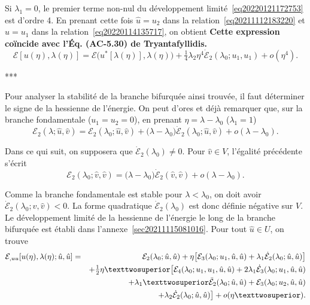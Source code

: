 \documentclass[12pt, final]{amsart}
\begin{document}
Si \(\lambda _1=0\), le premier terme non-nul du développement
limité~\eqref{eq20220121172753} est d'ordre 4. En prenant cette fois
\(\hat{u}=u_2\) dans la relation~\eqref{eq20211112183220} et \(\hat{u}=u_1\)
dans la relation~\eqref{eq20220114135717}, on obtient \textbf{Cette
  expression coïncide avec l'Éq. (AC-5.30) de Tryantafyllidis.}
\begin{equation}
  \mathcal E[u(\eta ), \lambda (\eta )]=\mathcal E\bigl(u^*[\lambda (\eta )], \lambda (\eta )\bigr)+\tfrac1{4}\lambda _2\eta ^4\dot{\mathcal E}_2(\lambda _0; u_1, u_1)+o(\eta ^4).
\end{equation}

\begin{center}
  ***
\end{center}

Pour analyser la stabilité de la branche bifurquée ainsi trouvée, il faut
déterminer le signe de la hessienne de l'énergie. On peut d'ores et déjà
remarquer que, sur la branche fondamentale (\(u_1=u_2=0\)), en prenant \(\eta =\lambda -\lambda _0\)
(\(\lambda _1=1\))
\begin{equation}
  \mathcal E_2(\lambda ; \hat{u}, \hat{v})
  =\mathcal E_2(\lambda _0; \hat{u}, \hat{v})+\bigl(\lambda -\lambda _0\bigr)\dot{\mathcal E}_2(\lambda _0; \hat{u}, \hat{v})+o(\lambda -\lambda _0).
\end{equation}

Dans ce qui suit, on supposera que \(\dot{\mathcal E}_2(\lambda _0)\neq0\). Pour \(\hat{v}\in V\),
l'égalité précédente s'écrit
\begin{equation}
  \mathcal E_2(\lambda _0; \hat{v}, \hat{v})=\bigl(\lambda -\lambda _0\bigr)\dot{\mathcal E}_2(\hat{v}, \hat{v})+o(\lambda -\lambda _0).
\end{equation}

Comme la branche fondamentale est stable pour \(\lambda <\lambda _0\), on doit avoir
\(\dot{\mathcal E}_2(\lambda _0; \hat{v}, \hat{v})<0\). La forme quadratique \(\dot{\mathcal E}_2(\lambda _0)\) est
donc définie négative sur \(V\). Le développement limité de la hessienne de
l'énergie le long de la branche bifurquée est établi dans
l'annexe~\ref{sec20211115081016}. Pour tout \(\hat{u}\in U\), on trouve
\begin{eqnarray}
  \notag
  \mathcal E_{,uu}[u(\eta ), \lambda (\eta ); \hat{u}, \hat{u}]
  &=&\mathcal E_2(\lambda _0; \hat{u}, \hat{u})+\eta \bigl[\mathcal E_3(\lambda _0; u_1, \hat{u}, \hat{u})
      +\lambda _1\dot{\mathcal E}_2(\lambda _0; \hat{u}, \hat{u})\bigr]\\
  \notag
  &&+\tfrac12\eta ²\bigl[\mathcal E_4(\lambda _0; u_1, u_1, \hat{u}, \hat{u})
     +2\lambda _1\dot{\mathcal E}_3(\lambda _0; u_1, \hat{u}, \hat{u})\\
  \notag
  &&+\lambda _1²\ddot{\mathcal E}_2(\lambda _0; \hat{u}, \hat{u})
     +\mathcal E_3(\lambda _0; u_2, \hat{u}, \hat{u})\\
  \label{eq20211115082025}
  &&+\lambda _2\dot{\mathcal E}_2(\lambda _0; \hat{u}, \hat{u})\bigr]+o(\eta ²).
\end{eqnarray}
\end{document}
